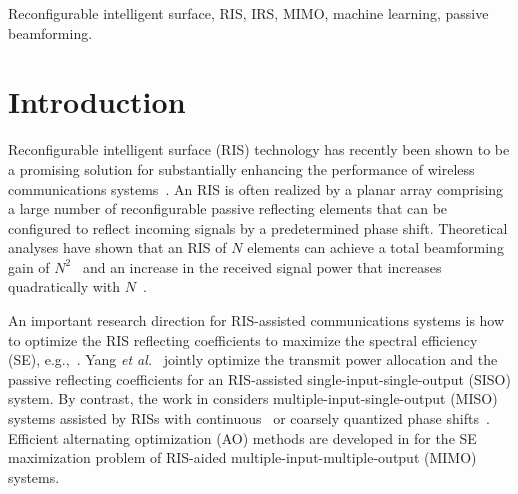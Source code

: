 \documentclass[conference]{IEEEtran}
\begin{document}
	\begin{IEEEkeywords}
		Reconfigurable intelligent surface, RIS, IRS, MIMO, machine learning, passive beamforming.
	\end{IEEEkeywords}
	\IEEEpeerreviewmaketitle
	
	
	\section{Introduction}
	Reconfigurable intelligent surface (RIS) technology has recently been shown to be a promising solution for substantially enhancing the performance of wireless communications systems~\cite{di_renzo_smart_2019}. An RIS is often realized by a planar array comprising a large number of reconfigurable passive reflecting elements that can be configured to reflect incoming signals by a predetermined phase shift. Theoretical analyses have shown that an RIS of $N$ elements can achieve a total beamforming gain of $N^2$~\cite{wu2019intelligent} and an increase in the received signal power that increases quadratically with $N$~\cite{wang2020intelligent, Basar2019Reconfigurable}. %
	
	An important research direction for RIS-assisted communications systems is how to optimize the RIS reflecting coefficients to maximize the spectral efficiency (SE), e.g.,~\cite{gong2020towards,yang2020intelligent,yang2019irs, yuan2020intelligent, han2019large, di2020practical,zhang2020capacity,nguyen2021hybrid,nguyen2021spectral}. Yang \textit{et al.}~\cite{yang2020intelligent} jointly optimize the transmit power allocation and the passive  reflecting coefficients for an RIS-assisted single-input-single-output (SISO) system. By contrast, the work in \cite{yang2019irs, yuan2020intelligent, han2019large, di2020practical} considers multiple-input-single-output (MISO) systems assisted by RISs with continuous~\cite{yang2019irs, yuan2020intelligent} or coarsely quantized phase shifts~\cite{han2019large,di2020practical}. Efficient alternating optimization (AO) methods are developed in \cite{zhang2020capacity, nguyen2021hybrid, nguyen2021spectral} for the SE maximization problem of RIS-aided multiple-input-multiple-output (MIMO) systems.
	
\end{document}
